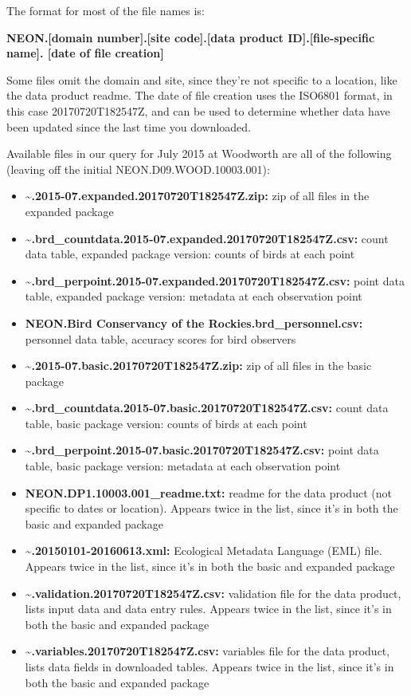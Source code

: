 \documentclass[]{book}
\begin{document}
The format for most of the file names is:

\textbf{NEON.{[}domain number{]}.{[}site code{]}.{[}data product ID{]}.{[}file-specific name{]}.
{[}date of file creation{]}}

Some files omit the domain and site, since they're not specific to a
location, like the data product readme. The date of file creation uses the
ISO6801 format, in this case 20170720T182547Z, and can be used to determine
whether data have been updated since the last time you downloaded.

Available files in our query for July 2015 at Woodworth are all of the following
(leaving off the initial NEON.D09.WOOD.10003.001):

\begin{itemize}
\item
  \textbf{\textasciitilde{}.2015-07.expanded.20170720T182547Z.zip:} zip of all files in the expanded
  package
\item
  \textbf{\textasciitilde{}.brd\_countdata.2015-07.expanded.20170720T182547Z.csv:} count data table,
  expanded package version: counts of birds at each point
\item
  \textbf{\textasciitilde{}.brd\_perpoint.2015-07.expanded.20170720T182547Z.csv:} point data table,
  expanded package version: metadata at each observation point
\item
  \textbf{NEON.Bird Conservancy of the Rockies.brd\_personnel.csv:} personnel data
  table, accuracy scores for bird observers
\item
  \textbf{\textasciitilde{}.2015-07.basic.20170720T182547Z.zip:} zip of all files in the basic package
\item
  \textbf{\textasciitilde{}.brd\_countdata.2015-07.basic.20170720T182547Z.csv:} count data table,
  basic package version: counts of birds at each point
\item
  \textbf{\textasciitilde{}.brd\_perpoint.2015-07.basic.20170720T182547Z.csv:} point data table,
  basic package version: metadata at each observation point
\item
  \textbf{NEON.DP1.10003.001\_readme.txt:} readme for the data product (not specific
  to dates or location). Appears twice in the list, since it's in both the basic
  and expanded package
\item
  \textbf{\textasciitilde{}.20150101-20160613.xml:} Ecological Metadata Language (EML) file. Appears
  twice in the list, since it's in both the basic and expanded package
\item
  \textbf{\textasciitilde{}.validation.20170720T182547Z.csv:} validation file for the data product,
  lists input data and data entry rules. Appears twice in the list, since it's in
  both the basic and expanded package
\item
  \textbf{\textasciitilde{}.variables.20170720T182547Z.csv:} variables file for the data product,
  lists data fields in downloaded tables. Appears twice in the list, since it's
  in both the basic and expanded package
\end{itemize}
\end{document}
